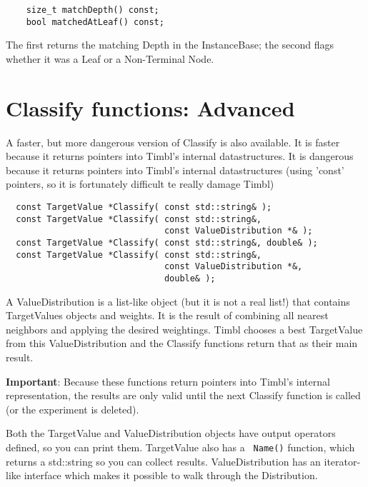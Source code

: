 \documentclass{report}
\begin{document}
\begin{footnotesize}
\begin{verbatim}
    size_t matchDepth() const;
    bool matchedAtLeaf() const;
\end{verbatim}
\end{footnotesize}

The first returns the matching Depth in the InstanceBase; the second 
flags whether it was a Leaf or a Non-Terminal Node.

\section{Classify functions: Advanced}

A faster, but more dangerous version of Classify is also available.
It is faster because it returns pointers into Timbl's internal
datastructures. It is dangerous because it returns pointers into
Timbl's internal datastructures (using 'const' pointers, so it is
fortunately difficult te really damage Timbl)

\begin{footnotesize}
\begin{verbatim}
  const TargetValue *Classify( const std::string& );
  const TargetValue *Classify( const std::string&, 
                               const ValueDistribution *& );
  const TargetValue *Classify( const std::string&, double& );
  const TargetValue *Classify( const std::string&, 
                               const ValueDistribution *&, 
                               double& );
\end{verbatim}
\end{footnotesize}

A ValueDistribution is a list-like object (but it is not a real list!)
that contains TargetValues objects and weights. It is the result of
combining all nearest neighbors and applying the desired weightings.
Timbl chooses a best TargetValue from this ValueDistribution and the
Classify functions return that as their main result.

{\bf Important}: Because these functions return pointers into Timbl's
internal representation, the results are only valid until the next
Classify function is called (or the experiment is deleted).

Both the TargetValue and ValueDistribution objects have output
operators defined, so you can print them.  TargetValue also has a {\tt
  Name()} function, which returns a std::string so you can collect
results.  ValueDistribution has an iterator-like interface which makes
it possible to walk through the Distribution.
\end{document}
